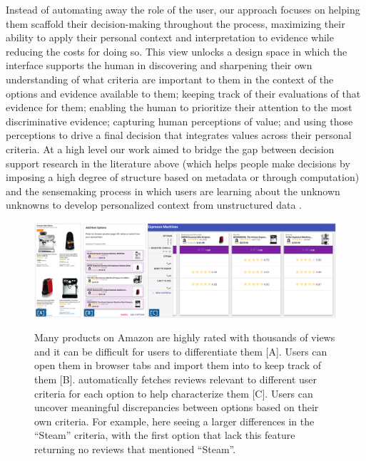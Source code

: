 Instead of automating away the role of the user, our approach focuses on helping them scaffold their decision-making throughout the process, maximizing their ability to apply their personal context and interpretation to evidence while reducing the costs for doing so. This view unlocks a design space in which the interface supports the human in discovering and sharpening their own understanding of what criteria are important to them in the context of the options and evidence available to them; keeping track of their evaluations of that evidence for them; enabling the human to prioritize their attention to the most discriminative evidence; capturing human perceptions of value; and using those perceptions to drive a final decision that integrates values across their personal criteria. At a high level our work aimed to bridge the gap between decision support research in the literature above (which helps people make decisions by imposing a high degree of structure based on metadata or through computation) and the sensemaking process in which users are learning about the unknown unknowns to develop personalized context from unstructured data \cite{russell1993cost,marchionini2006exploratory}.

\begin{figure}
    \centering
    \textcolor{gray}{\includegraphics[width=1.0\textwidth]{Chapters/Mesh/figures/Import.png}}
    \caption[Importing tabs into \SYSTEM as product options]{Many products on Amazon are highly rated with thousands of views and it can be difficult for users to differentiate them [A]. Users can open them in browser tabs and import them into \SYSTEM to keep track of them [B]. \SYSTEM automatically fetches reviews relevant to different user criteria for each option to help characterize them [C]. Users can uncover meaningful discrepancies between options based on their own criteria. For example, here seeing a larger differences in the ``Steam'' criteria, with the first option that lack this feature returning no reviews that mentioned ``Steam''.}
    \label{fig:import}
\end{figure}



